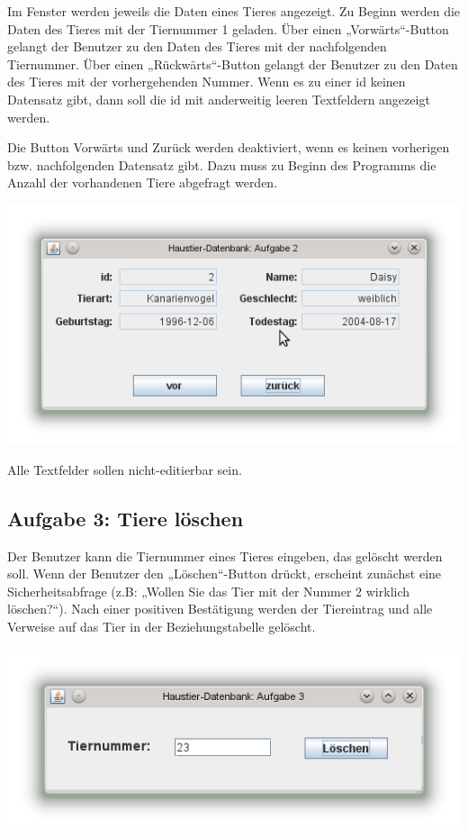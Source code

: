 Im Fenster werden jeweils die Daten eines Tieres angezeigt. Zu Beginn werden die
Daten des Tieres mit der Tiernummer 1 geladen.
Über einen „Vorwärts“-Button gelangt der Benutzer zu den Daten des Tieres mit
der nachfolgenden Tiernummer. Über einen „Rückwärts“-Button gelangt der Benutzer
zu den Daten des Tieres mit der vorhergehenden Nummer. Wenn es zu einer id
keinen Datensatz gibt, dann soll die id mit anderweitig leeren Textfeldern
angezeigt werden.

\begin{minipage}{0.3\textwidth}
Die Button Vorwärts und Zurück werden deaktiviert, wenn es keinen vorherigen
bzw. nachfolgenden Datensatz gibt. Dazu muss zu Beginn des Programms die Anzahl
der vorhandenen Tiere abgefragt werden.
\end{minipage}
\begin{minipage}{0.7\textwidth}
\includegraphics[width=1.0\textwidth]{./inf/SEKII/37_JavaSQL_Datenbankzugriffe/HaustierAufgabe2.png}
\end{minipage}

Alle Textfelder sollen nicht-editierbar sein.

\subsection{Aufgabe 3: Tiere löschen}

\begin{minipage}{0.5\textwidth}
Der Benutzer kann die Tiernummer eines Tieres eingeben, das gelöscht werden
soll. Wenn der Benutzer den „Löschen“-Button drückt, erscheint zunächst eine
Sicherheitsabfrage (z.B: „Wollen Sie das Tier mit der Nummer 2 wirklich
löschen?“). Nach einer positiven Bestätigung werden der Tiereintrag und alle
Verweise auf das Tier in der Beziehungstabelle gelöscht.
\end{minipage}
\begin{minipage}{0.5\textwidth}
\includegraphics[width=1.0\textwidth]{./inf/SEKII/37_JavaSQL_Datenbankzugriffe/HaustierAufgabe3.png}
\end{minipage}

